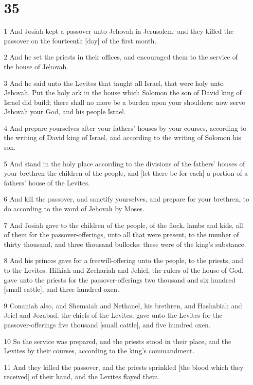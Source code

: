 \chapter{35}

\par 1 And Josiah kept a passover unto Jehovah in Jerusalem: and they killed the passover on the fourteenth [day] of the first month.
\par 2 And he set the priests in their offices, and encouraged them to the service of the house of Jehovah.
\par 3 And he said unto the Levites that taught all Israel, that were holy unto Jehovah, Put the holy ark in the house which Solomon the son of David king of Israel did build; there shall no more be a burden upon your shoulders: now serve Jehovah your God, and his people Israel.
\par 4 And prepare yourselves after your fathers' houses by your courses, according to the writing of David king of Israel, and according to the writing of Solomon his son.
\par 5 And stand in the holy place according to the divisions of the fathers' houses of your brethren the children of the people, and [let there be for each] a portion of a fathers' house of the Levites.
\par 6 And kill the passover, and sanctify yourselves, and prepare for your brethren, to do according to the word of Jehovah by Moses.
\par 7 And Josiah gave to the children of the people, of the flock, lambs and kids, all of them for the passover-offerings, unto all that were present, to the number of thirty thousand, and three thousand bullocks: these were of the king's substance.
\par 8 And his princes gave for a freewill-offering unto the people, to the priests, and to the Levites. Hilkiah and Zechariah and Jehiel, the rulers of the house of God, gave unto the priests for the passover-offerings two thousand and six hundred [small cattle], and three hundred oxen.
\par 9 Conaniah also, and Shemaiah and Nethanel, his brethren, and Hashabiah and Jeiel and Jozabad, the chiefs of the Levites, gave unto the Levites for the passover-offerings five thousand [small cattle], and five hundred oxen.
\par 10 So the service was prepared, and the priests stood in their place, and the Levites by their courses, according to the king's commandment.
\par 11 And they killed the passover, and the priests sprinkled [the blood which they received] of their hand, and the Levites flayed them.
